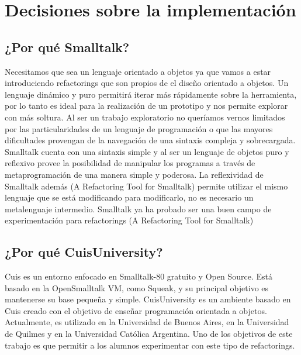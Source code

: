 \section{Decisiones sobre la implementación}

\subsection*{¿Por qué Smalltalk?}
Necesitamos que sea un lenguaje orientado a objetos ya que vamos a estar introduciendo refactorings
que son propios de el diseño orientado a objetos. Un lenguaje dinámico y puro permitirá iterar más
rápidamente sobre la herramienta, por lo tanto es ideal para la realización de un prototipo y nos
permite explorar con más soltura. Al ser un trabajo exploratorio no queríamos vernos limitados por
las particularidades de un lenguaje de programación o que las mayores dificultades provengan de la
navegación de una sintaxis compleja y sobrecargada. Smalltalk cuenta con una sintaxis simple y al
ser un lenguaje de objetos puro y reflexivo provee la posibilidad de manipular los programas a
través de metaprogramación de una manera simple y poderosa. La reflexividad de Smalltalk además (A
Refactoring Tool for Smalltalk) permite utilizar el mismo lenguaje que se está modificando para
modificarlo, no es necesario un metalenguaje intermedio.
Smalltalk ya ha probado ser una buen campo de experimentación para refactorings (A Refactoring Tool
for Smalltalk)


\subsection*{¿Por qué CuisUniversity?}
Cuis es un entorno enfocado en Smalltalk-80 gratuito y Open Source. Está basado en la OpenSmalltalk
VM, como Squeak, y su principal objetivo es mantenerse su base pequeña y simple. CuisUniversity es
un ambiente basado en Cuis creado con el objetivo de enseñar programación orientada a objetos.
Actualmente, es utilizado en la Universidad de Buenos Aires, en la Universidad de Quilmes y en la
Universidad Católica Argentina. Uno de los objetivos de este trabajo es que permitir a los alumnos
experimentar con este tipo de refactorings.


